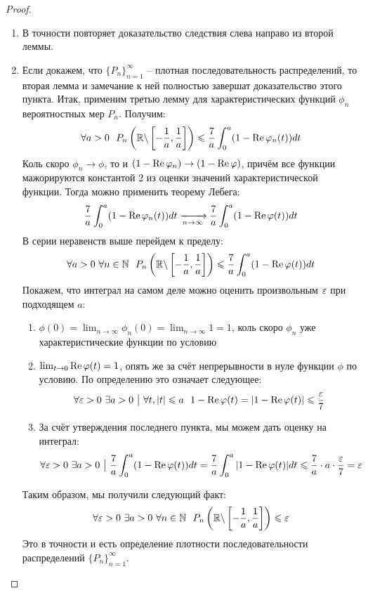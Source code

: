 \begin{proof}~
    \begin{enumerate}
        \item В точности повторяет доказательство следствия слева направо из второй леммы.
        \item Если докажем, что $\{P_n\}_{n = 1}^\infty$ -- плотная последовательность распределений, то вторая лемма и замечание к ней полностью завершат доказательство этого пункта. Итак, применим третью лемму для характеристических функций $\phi_n$ вероятностных мер $P_n$. Получим:
        \[
            \forall a > 0\ \ P_n \left(\mathbb{R} \backslash \left[-\frac{1}{a}, \frac{1}{a}\right]\right) \leqslant \frac{7}{a} \int_0^a (1 - \operatorname{Re}\varphi_n(t)) dt
        \]
        Коль скоро $\phi_n \to \phi$, то и $(1 - \operatorname{Re}\varphi_n) \to (1 - \operatorname{Re}\varphi)$, причём все функции мажорируются константой 2 из оценки значений характеристической функции. Тогда можно применить теорему Лебега:
        \[
            \frac{7}{a} \int_0^a (1 - \operatorname{Re}\varphi_n(t)) dt \xrightarrow[n \to \infty]{} \frac{7}{a} \int_0^a (1 - \operatorname{Re}\varphi(t))dt
        \]
        В серии неравенств выше перейдем к пределу:
        \[
            \forall a > 0\ \forall n \in \mathbb{N}\ \ P_n \left(\mathbb{R} \backslash \left[-\frac{1}{a}, \frac{1}{a}\right]\right) \leqslant \frac{7}{a} \int_0^a (1 - \operatorname{Re}\varphi(t))dt
        \]
        Покажем, что интеграл на самом деле можно оценить произвольным $\varepsilon$ при подходящем $a$:
        \begin{enumerate}
        	\item $\phi(0) = \lim_{n \to \infty} \phi_n(0) = \lim_{n \to \infty} 1 = 1$, коль скоро $\phi_n$ уже характеристические функции по условию
        	
        	\item $\lim_{t \to 0} \operatorname{Re}\varphi(t) = 1$, опять же за счёт непрерывности в нуле функции $\phi$ по условию. По определению это означает следующее:
        	\[
        		\forall \varepsilon > 0\ \exists a > 0 \ \big|\  \forall t, |t| \leqslant a\ \ 1 - \operatorname{Re}\varphi(t) = |1 - \operatorname{Re}\varphi(t)| \leqslant \frac{\varepsilon}{7}
        	\]
        	
        	\item За счёт утверждения последнего пункта, мы можем дать оценку на интеграл:
        	\[
        		\forall \varepsilon > 0\ \exists a > 0 \ \big|\  \frac{7}{a} \int_0^a (1 - \operatorname{Re}\varphi(t))dt = \frac{7}{a} \int_0^a |1 - \operatorname{Re}\varphi(t)|dt \leqslant \frac{7}{a} \cdot a \cdot \frac{\varepsilon}{7} = \varepsilon
        	\]
        \end{enumerate}
        Таким образом, мы получили следующий факт:
        \[
            \forall \varepsilon > 0\ \exists a > 0\ \forall n \in \mathbb{N} \ \ P_n\left(\mathbb{R} \backslash \left[-\frac{1}{a}, \frac{1}{a}\right]\right) \leqslant \varepsilon
        \]
        Это в точности и есть определение плотности последовательности распределений $\{P_n\}_{n = 1}^\infty$.
    \end{enumerate}
\end{proof}


